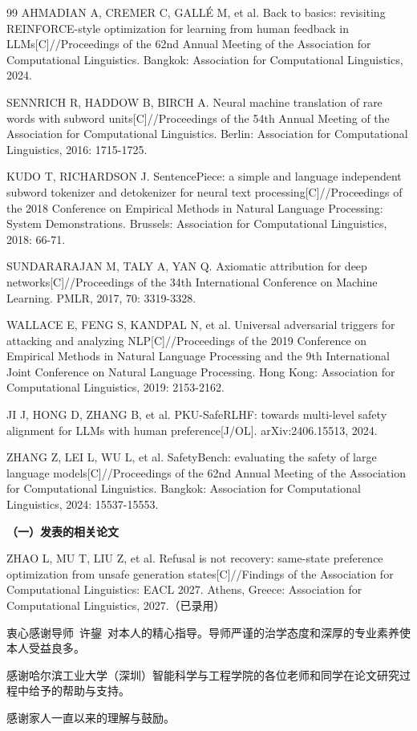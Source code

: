 \documentclass[fontset=fandol,type=master,campus=shenzhen,etitleauto=true]{hithesisbook}
\begin{document}
\begin{thebibliography}{99}
 AHMADIAN A, CREMER C, GALL\'E M, et al. Back to basics: revisiting REINFORCE-style optimization for learning from human feedback in LLMs[C]//Proceedings of the 62nd Annual Meeting of the Association for Computational Linguistics. Bangkok: Association for Computational Linguistics, 2024.

 SENNRICH R, HADDOW B, BIRCH A. Neural machine translation of rare words with subword units[C]//Proceedings of the 54th Annual Meeting of the Association for Computational Linguistics. Berlin: Association for Computational Linguistics, 2016: 1715-1725.

 KUDO T, RICHARDSON J. SentencePiece: a simple and language independent subword tokenizer and detokenizer for neural text processing[C]//Proceedings of the 2018 Conference on Empirical Methods in Natural Language Processing: System Demonstrations. Brussels: Association for Computational Linguistics, 2018: 66-71.

 SUNDARARAJAN M, TALY A, YAN Q. Axiomatic attribution for deep networks[C]//Proceedings of the 34th International Conference on Machine Learning. PMLR, 2017, 70: 3319-3328.

 WALLACE E, FENG S, KANDPAL N, et al. Universal adversarial triggers for attacking and analyzing NLP[C]//Proceedings of the 2019 Conference on Empirical Methods in Natural Language Processing and the 9th International Joint Conference on Natural Language Processing. Hong Kong: Association for Computational Linguistics, 2019: 2153-2162.

 JI J, HONG D, ZHANG B, et al. PKU-SafeRLHF: towards multi-level safety alignment for LLMs with human preference[J/OL]. arXiv:2406.15513, 2024.

 ZHANG Z, LEI L, WU L, et al. SafetyBench: evaluating the safety of large language models[C]//Proceedings of the 62nd Annual Meeting of the Association for Computational Linguistics. Bangkok: Association for Computational Linguistics, 2024: 15537-15553.

\end{thebibliography}

\begin{publication}
\noindent\textbf{（一）发表的相关论文}

\noindent [1] ZHAO L, MU T, LIU Z, et al. Refusal is not recovery: same-state preference optimization from unsafe generation states[C]//Findings of the Association for Computational Linguistics: EACL 2027. Athens, Greece: Association for Computational Linguistics, 2027.（已录用）
\end{publication}

\authorization

\begin{acknowledgements}
衷心感谢导师~许鋆~对本人的精心指导。导师严谨的治学态度和深厚的专业素养使本人受益良多。

感谢哈尔滨工业大学（深圳）智能科学与工程学院的各位老师和同学在论文研究过程中给予的帮助与支持。

感谢家人一直以来的理解与鼓励。
\end{acknowledgements}
\end{document}

